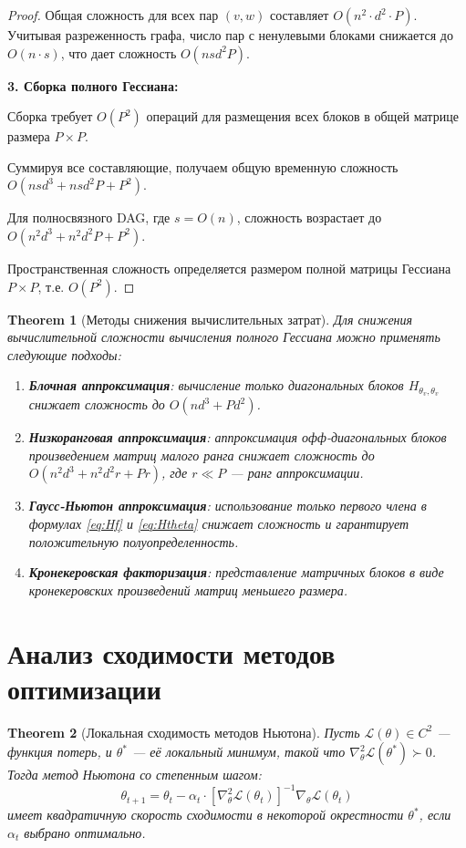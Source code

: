 \documentclass[11pt]{article}
\newtheorem{theorem}{Theorem}
\begin{document}
\begin{proof}
  Общая сложность для всех пар $(v,w)$ составляет $O(n^2 \cdot d^2 \cdot P)$. Учитывая разреженность графа,
  число пар с ненулевыми блоками снижается до $O(n \cdot s)$, что дает сложность $O(n s d^2 P)$.

  \textbf{3. Сборка полного Гессиана:}

  Сборка требует $O(P^2)$ операций для размещения всех блоков в общей матрице размера $P \times P$.

  Суммируя все составляющие, получаем общую временную сложность $O(n s d^3 + n s d^2 P + P^2)$.

  Для полносвязного DAG, где $s = O(n)$, сложность возрастает до $O(n^2 d^3 + n^2 d^2 P + P^2)$.

  Пространственная сложность определяется размером полной матрицы Гессиана $P \times P$, т.е. $O(P^2)$.
\end{proof}

\begin{theorem}[Методы снижения вычислительных затрат]
  Для снижения вычислительной сложности вычисления полного Гессиана можно применять следующие подходы:
  \begin{enumerate}
    \item \textbf{Блочная аппроксимация}: вычисление только диагональных блоков $H_{\theta_v, \theta_v}$
      снижает сложность до $O(n d^3 + P d^2)$.
    \item \textbf{Низкоранговая аппроксимация}: аппроксимация офф-диагональных блоков произведением матриц
      малого ранга снижает сложность до $O(n^2 d^3 + n^2 d^2 r + P r)$, где $r \ll P$ — ранг аппроксимации.
    \item \textbf{Гаусс-Ньютон аппроксимация}: использование только первого члена в формулах \eqref{eq:Hf} и
      \eqref{eq:Htheta} снижает сложность и гарантирует положительную полуопределенность.
    \item \textbf{Кронекеровская факторизация}: представление матричных блоков в виде кронекеровских
      произведений матриц меньшего размера.
  \end{enumerate}
\end{theorem}

\section{Анализ сходимости методов оптимизации}

\begin{theorem}[Локальная сходимость методов Ньютона]
  Пусть $\mathcal{L}(\theta) \in C^2$ — функция потерь, и $\theta^*$ — её локальный минимум, такой что
  $\nabla^2_\theta \mathcal{L}(\theta^*) \succ 0$. Тогда метод Ньютона со степенным шагом:
  \[
    \theta_{t+1} = \theta_t - \alpha_t \cdot [\nabla^2_\theta \mathcal{L}(\theta_t)]^{-1} \nabla_\theta
    \mathcal{L}(\theta_t)
  \]
  имеет квадратичную скорость сходимости в некоторой окрестности $\theta^*$, если $\alpha_t$ выбрано оптимально.
\end{theorem}
\end{document}
